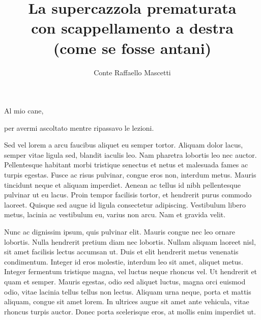 \documentclass[target=mst,aauheader=,style=]{thud}
\title{La supercazzola prematurata \\ con scappellamento a destra \\ (come se fosse antani)}
\author{Conte Raffaello Mascetti}
\begin{document}
\maketitle

\begin{dedication}
	Al mio cane,\par per avermi ascoltato mentre ripassavo le lezioni.
\end{dedication}

\acknowledgements
Sed vel lorem a arcu faucibus aliquet eu semper tortor. Aliquam dolor lacus, semper vitae ligula sed, blandit iaculis leo. Nam pharetra lobortis leo nec auctor. Pellentesque habitant morbi tristique senectus et netus et malesuada fames ac turpis egestas. Fusce ac risus pulvinar, congue eros non, interdum metus. Mauris tincidunt neque et aliquam imperdiet. Aenean ac tellus id nibh pellentesque pulvinar ut eu lacus. Proin tempor facilisis tortor, et hendrerit purus commodo laoreet. Quisque sed augue id ligula consectetur adipiscing. Vestibulum libero metus, lacinia ac vestibulum eu, varius non arcu. Nam et gravida velit.

\abstract
Nunc ac dignissim ipsum, quis pulvinar elit. Mauris congue nec leo ornare lobortis. Nulla hendrerit pretium diam nec lobortis. Nullam aliquam laoreet nisl, sit amet facilisis lectus accumsan ut. Duis et elit hendrerit metus venenatis condimentum. Integer id eros molestie, interdum leo sit amet, aliquet metus. Integer fermentum tristique magna, vel luctus neque rhoncus vel. Ut hendrerit et quam et semper. Mauris egestas, odio sed aliquet luctus, magna orci euismod odio, vitae lacinia tellus tellus non lectus. Aliquam urna neque, porta et mattis aliquam, congue sit amet lorem. In ultrices augue sit amet ante vehicula, vitae rhoncus turpis auctor. Donec porta scelerisque eros, at mollis enim imperdiet ut. 

\tableofcontents



\mainmatter

\end{document}
